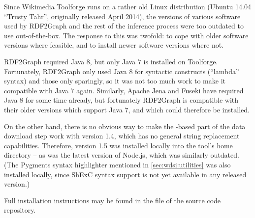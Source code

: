 Since Wikimedia Toolforge runs on a rather old Linux distribution
(Ubuntu 14.04 “Trusty Tahr”, originally released April 2014),
the versions of various software used by \gls{RDF2Graph} and the rest of the inference process
were too outdated to use out-of-the-box.
The response to this was twofold:
to cope with older software versions where feasible,
and to install newer software versions where not.

\gls{RDF2Graph} required Java 8,
but only Java 7 is installed on Toolforge.
Fortunately, \gls{RDF2Graph} only used Java 8 for syntactic constructs (“lambda” syntax)
and those only sparingly, so it was not too much work to make it compatible with Java 7 again.
Similarly, Apache Jena and Fuseki have required Java 8 for some time already,
but fortunately \gls{RDF2Graph} is compatible with their older versions which support Java 7,
and which could therefore be installed.

On the other hand, there is no obvious way to make the -based part of the data download step
work with  version 1.4, which has no general string replacement capabilities.
Therefore,  version 1.5 was installed locally into the tool’s home directory –
as was the latest version of Node.js, which was similarly outdated.
(The Pygments syntax highlighter mentioned in \cref{sec:wdsi:utilities} was also installed locally,
since ShExC syntax support is not yet available in any released version.)

Full installation instructions may be found in the  file of the source code repository.
